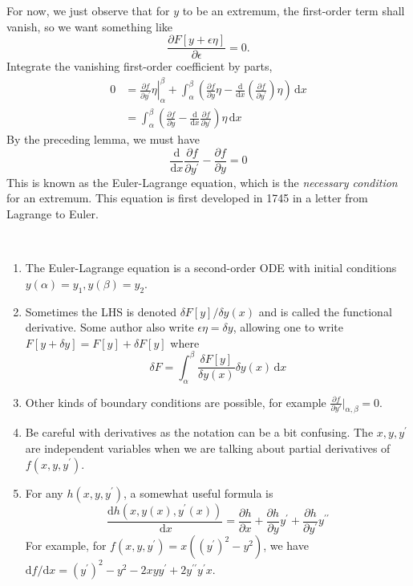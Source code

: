 \documentclass{article}
\begin{document}
For now, we just observe that for $y$ to be an extremum, the first-order term shall vanish, so we want something like 
\[
    \frac{\partial F[y+\epsilon \eta]}{\partial \epsilon} =0.
\]
Integrate the vanishing first-order coefficient by parts,
\begin{align*}
    0&=\left.\frac{\partial f}{\partial y^\prime}\eta\right|_\alpha^\beta+\int_\alpha^\beta\left( \frac{\partial f}{\partial y}\eta-\frac{\mathrm d}{\mathrm dx}\left( \frac{\partial f}{\partial y^\prime} \right)\eta \right)\,\mathrm dx\\
    &=\int_\alpha^\beta\left( \frac{\partial f}{\partial y}-\frac{\mathrm d}{\mathrm dx}\frac{\partial f}{\partial y^\prime} \right)\eta\,\mathrm dx
\end{align*}
By the preceding lemma, we must have
$$\boxed{\frac{\mathrm d}{\mathrm dx}\frac{\partial f}{\partial y^\prime}-\frac{\partial f}{\partial y}=0}$$
This is known as the Euler-Lagrange equation, which is the \textit{necessary condition} for an extremum. This equation is first developed in 1745 in a letter from Lagrange to Euler.
\begin{remark}\ 
    \begin{enumerate}
        \item The Euler-Lagrange equation is a second-order ODE with initial conditions $y(\alpha)=y_1,y(\beta)=y_2$.
        \item Sometimes the LHS is denoted $\delta F[y]/\delta y(x)$ and is called the functional derivative.
        Some author also write $\epsilon\eta=\delta y$, allowing one to write $F[y+\delta y]=F[y]+\delta F[y]$ where
        $$\delta F=\int_\alpha^\beta\frac{\delta F[y]}{\delta y(x)}\delta y(x)\,\mathrm dx$$
        \item Other kinds of boundary conditions are possible, for example $ \frac{\partial f}{\partial y'}\Big|_{\alpha,\beta}=0  $.
        \item Be careful with derivatives as the notation can be a bit confusing.
        The $x,y,y^\prime$ are independent variables when we are talking about partial derivatives of $f(x,y,y^\prime)$.
        \item For any $h(x,y,y^\prime)$, a somewhat useful formula is
        $$\frac{\mathrm dh(x,y(x),y^\prime(x))}{\,\mathrm dx}=\frac{\partial h}{\partial x}+\frac{\partial h}{\partial y}y^\prime+\frac{\partial h}{\partial y^\prime}y^{\prime\prime}$$
        For example, for $f(x,y,y^\prime)=x((y^\prime)^2-y^2)$, we have $\mathrm df/\mathrm dx=(y^\prime)^2-y^2-2xyy^\prime+2y^{\prime\prime}y^\prime x$.
    \end{enumerate}
\end{remark}
\end{document}
